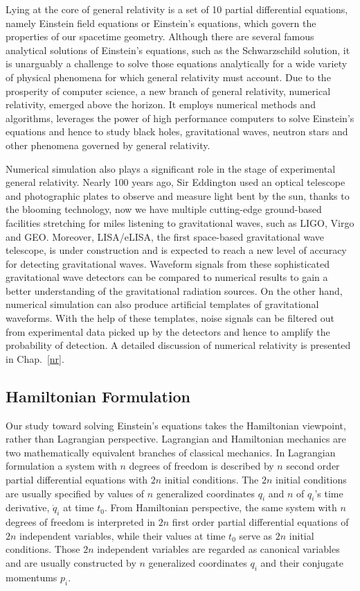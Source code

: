 Lying at the core of general relativity is a set of 10 partial differential equations, namely Einstein field equations or Einstein's equations, which govern the properties of our spacetime geometry. Although there are several famous analytical solutions of Einstein's equations, such as the Schwarzschild solution, it is unarguably a challenge to solve those equations analytically for a wide variety of physical phenomena for which general relativity must account. Due to the prosperity of computer science, a new branch of general relativity, numerical relativity, emerged above the horizon. It employs numerical methods and algorithms, leverages the power of high performance computers to solve Einstein's equations and hence to study black holes, gravitational waves, neutron stars and other phenomena governed by general relativity.

Numerical simulation also plays a significant role in the stage of experimental general relativity. Nearly 100 years ago, Sir Eddington used an optical telescope and photographic plates to observe and measure light bent by the sun, thanks to the blooming technology, now we have multiple cutting-edge ground-based facilities stretching for miles listening to gravitational waves, such as LIGO, Virgo and GEO. Moreover, LISA/eLISA, the first space-based gravitational wave telescope, is under construction and is expected to reach a new level of accuracy for detecting gravitational waves. Waveform signals from these sophisticated gravitational wave detectors can be compared to numerical results to gain a better understanding of the gravitational radiation sources. On the other hand, numerical simulation can also produce artificial templates of gravitational waveforms. With the help of these templates, noise signals can be filtered out from experimental data picked up by the detectors and hence to amplify the probability of detection. A detailed discussion of numerical relativity is presented in Chap.~\ref{nr}. 
\subsection{Hamiltonian Formulation}\label{ham}
Our study toward solving Einstein's equations takes the Hamiltonian viewpoint, rather than Lagrangian perspective. Lagrangian and Hamiltonian mechanics are two mathematically equivalent branches of classical mechanics. In Lagrangian formulation a system with $n$ degrees of freedom is described by $n$ second order partial differential equations with $2n$ initial conditions. The $2n$ initial conditions are usually specified by values of $n$ generalized coordinates $q_{i}$ and $n$ of $q_{i}$'s time derivative, ${\dot q}_{i}$ at time $t_{0}$. From Hamiltonian perspective, the same system with $n$ degrees of freedom is interpreted in $2n$ first order partial differential equations of $2n$ independent variables, while their values at time $t_{0}$ serve as $2n$ initial conditions. Those $2n$ independent variables are regarded as canonical variables and are usually constructed by $n$ generalized coordinates $q_{i}$ and their conjugate momentums $p_{i}$.

